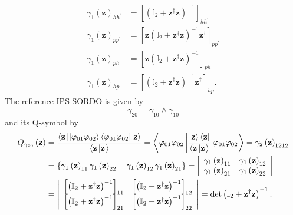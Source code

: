 \documentclass[aps,preprint]{revtex4}%
\begin{document}
\begin{align}
\gamma_{1}\left(  \mathbf{z}\right)  _{hh^{\prime}} &  =\left[  \left(
\mathbb{I}_{2}+\mathbf{z}^{\dagger}\mathbf{z}\right)  ^{-1}\right]
_{hh^{\prime}}\nonumber\\
\gamma_{1}\left(  \mathbf{z}\right)  _{pp^{\prime}} &  =\left[  \mathbf{z}%
\left(  \mathbb{I}_{2}+\mathbf{z}^{\dagger}\mathbf{z}\right)  ^{-1}%
\mathbf{z}^{\dagger}\right]  _{pp^{\prime}}\nonumber\\
\gamma_{1}\left(  \mathbf{z}\right)  _{ph} &  =\left[  \mathbf{z}\left(
\mathbb{I}_{2}+\mathbf{z}^{\dagger}\mathbf{z}\right)  ^{-1}\right]
_{ph}\nonumber\\
\gamma_{1}\left(  \mathbf{z}\right)  _{hp} &  =\left[  \left(  \mathbb{I}%
_{2}+\mathbf{z}^{\dagger}\mathbf{z}\right)  ^{-1}\mathbf{z}^{\dagger}\right]
_{hp}.
\end{align}
The reference IPS SORDO is given by
\begin{equation}
\gamma_{20}=\gamma_{10}\wedge\gamma_{10}%
\end{equation}
and its Q-symbol by
\begin{align}
Q_{\gamma_{20}}\left(  \mathbf{z}\right)   &  =\frac{\left\langle
\mathbf{z}\left\vert \left\vert \varphi_{01}\varphi_{02}\right\rangle
\left\langle \varphi_{01}\varphi_{02}\right\vert \right.  \mathbf{z}%
\right\rangle }{\left\langle \mathbf{z\left\vert \mathbf{z}\right.
}\right\rangle }=\left\langle \varphi_{01}\varphi_{02}\left\vert
\frac{\left\vert \mathbf{z}\right\rangle \left\langle \mathbf{z}\right\vert
}{\left\langle \mathbf{z\left\vert \mathbf{z}\right.  }\right\rangle }\right.
\varphi_{01}\varphi_{02}\right\rangle =\gamma_{2}\left(  \mathbf{z}\right)
_{1212}\nonumber\\
&  =\left\{  \gamma_{1}\left(  \mathbf{z}\right)  _{11}\gamma_{1}\left(
\mathbf{z}\right)  _{22}-\gamma_{1}\left(  \mathbf{z}\right)  _{12}\gamma
_{1}\left(  \mathbf{z}\right)  _{21}\right\}  =\left\vert
\begin{array}
[c]{cc}%
\gamma_{1}\left(  \mathbf{z}\right)  _{11} & \gamma_{1}\left(  \mathbf{z}%
\right)  _{12}\\
\gamma_{1}\left(  \mathbf{z}\right)  _{21} & \gamma_{1}\left(  \mathbf{z}%
\right)  _{22}%
\end{array}
\right\vert \nonumber\\
&  =\left\vert
\begin{array}
[c]{cc}%
\left[  \left(  \mathbb{I}_{2}+\mathbf{z}^{\dagger}\mathbf{z}\right)
^{-1}\right]  _{11} & \left[  \left(  \mathbb{I}_{2}+\mathbf{z}^{\dagger
}\mathbf{z}\right)  ^{-1}\right]  _{12}\\
\left[  \left(  \mathbb{I}_{2}+\mathbf{z}^{\dagger}\mathbf{z}\right)
^{-1}\right]  _{21} & \left[  \left(  \mathbb{I}_{2}+\mathbf{z}^{\dagger
}\mathbf{z}\right)  ^{-1}\right]  _{22}%
\end{array}
\right\vert =\det\left(  \mathbb{I}_{2}+\mathbf{z}^{\dagger}\mathbf{z}\right)
^{-1}.\nonumber
\end{align}
\end{document}
